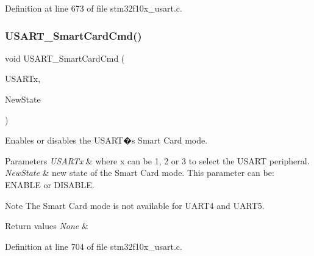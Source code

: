 Definition at line 673 of file stm32f10x\+\_\+usart.\+c.

\mbox{\label{group___u_s_a_r_t___private___functions_gabd1347e244c623447151ba3a5e986c5f}} 
\subsubsection{\texorpdfstring{U\+S\+A\+R\+T\+\_\+\+Smart\+Card\+Cmd()}{USART\_SmartCardCmd()}}
{\footnotesize\ttfamily void U\+S\+A\+R\+T\+\_\+\+Smart\+Card\+Cmd (\begin{DoxyParamCaption}\item[{\hyperlink{struct_u_s_a_r_t___type_def}{U\+S\+A\+R\+T\+\_\+\+Type\+Def} $\ast$}]{U\+S\+A\+R\+Tx,  }\item[{\hyperlink{group___exported__types_gac9a7e9a35d2513ec15c3b537aaa4fba1}{Functional\+State}}]{New\+State }\end{DoxyParamCaption})}



Enables or disables the U\+S\+A\+R\+T�s Smart Card mode. 


\begin{DoxyParams}{Parameters}
{\em U\+S\+A\+R\+Tx} & where x can be 1, 2 or 3 to select the U\+S\+A\+RT peripheral. \\
\hline
{\em New\+State} & new state of the Smart Card mode. This parameter can be\+: E\+N\+A\+B\+LE or D\+I\+S\+A\+B\+LE. \\
\hline
\end{DoxyParams}
\begin{DoxyNote}{Note}
The Smart Card mode is not available for U\+A\+R\+T4 and U\+A\+R\+T5. 
\end{DoxyNote}

\begin{DoxyRetVals}{Return values}
{\em None} & \\
\hline
\end{DoxyRetVals}


Definition at line 704 of file stm32f10x\+\_\+usart.\+c.

\mbox{\label{group___u_s_a_r_t___private___functions_ga62e22f47e38aa53f2edce8771f7a5dfa}} 
